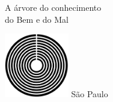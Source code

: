 




\begingroup\thispagestyle{empty}\vspace*{.05\textheight} 

              \formular
              
              \LARGE\noindent
              A árvore do conhecimento\\ 
              do Bem e do Mal

              \vfill
                                    
              \vfill\noindent\includegraphics[width=0.21\textwidth]{logo}
              \break{} 
              \smallskip
              {\fontsize{30}{40}%
              \scriptsize\noindent São Paulo\quad\the\year}

\endgroup
\pagebreak
